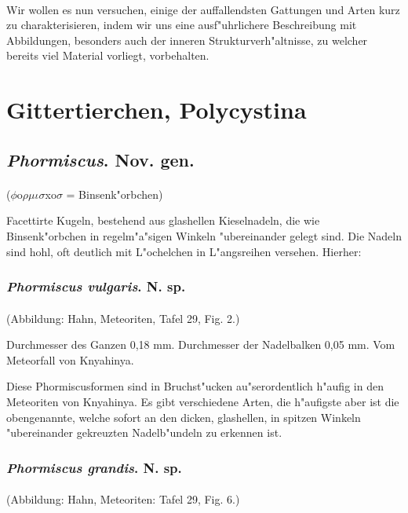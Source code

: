 \documentclass[a4paper, 11pt, oneside]{article}
\begin{document}
\paragraph{}
Wir wollen es nun versuchen, einige der auffallendsten Gattungen und Arten kurz zu charakterisieren, indem wir uns eine ausf"uhrlichere Beschreibung mit Abbildungen, besonders auch der inneren Strukturverh"altnisse, zu welcher bereits viel Material vorliegt, vorbehalten.
\clearpage
\section{Gittertierchen, Polycystina}
\subsection{\emph{Phormiscus}. Nov. gen.}
\paragraph{}
($\phi$o$\rho\mu\iota\sigma$xo$\sigma$ = Binsenk"orbchen)%

Facettirte Kugeln, bestehend aus glashellen Kieselnadeln, die wie Binsenk"orbchen in regelm"a"sigen Winkeln "ubereinander gelegt sind. Die Nadeln sind hohl, oft deutlich mit L"ochelchen in L"angsreihen versehen. Hierher:
\subsubsection{\emph{Phormiscus vulgaris}. N. sp.}
\paragraph{}
(Abbildung: Hahn, Meteoriten, Tafel 29, Fig. 2.)

Durchmesser des Ganzen 0,18 mm. Durchmesser der Nadelbalken 0,05 mm. Vom Meteorfall von Knyahinya.

Diese Phormiscusformen sind in Bruchst"ucken au"serordentlich h"aufig in den Meteoriten von Knyahinya. Es gibt verschiedene Arten, die h"aufigste aber ist die obengenannte, welche sofort an den dicken, glashellen, in spitzen Winkeln "ubereinander gekreuzten Nadelb"undeln zu erkennen ist.
\subsubsection{\emph{Phormiscus grandis}. N. sp.}
\paragraph{}
(Abbildung: Hahn, Meteoriten: Tafel 29, Fig. 6.)
\end{document}

